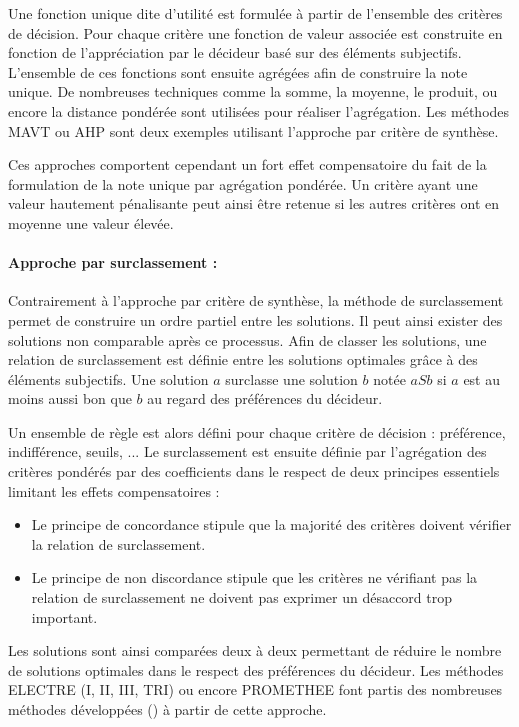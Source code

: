 Une fonction unique dite d’utilité est formulée à partir de l’ensemble des critères
de décision. Pour chaque critère une fonction de valeur associée est construite en
fonction de l’appréciation par le décideur basé sur des éléments subjectifs.
L’ensemble de ces fonctions sont ensuite agrégées afin de construire la note unique.
De nombreuses techniques comme la somme, la moyenne, le produit, ou encore la distance
pondérée sont utilisées pour réaliser l’agrégation.
Les méthodes MAVT ou AHP sont deux exemples utilisant l’approche par critère de
synthèse.

Ces approches comportent cependant un fort effet compensatoire du fait de la formulation
de la note unique par agrégation pondérée. Un critère ayant une valeur hautement
pénalisante peut ainsi être retenue si les autres critères ont en moyenne une valeur élevée.



\paragraph{Approche par surclassement :} %
\label{par:approche_par_surclassement}
Contrairement à l’approche par critère de synthèse, la méthode de surclassement
permet de construire un ordre partiel entre les solutions. Il peut ainsi exister
des solutions non comparable après ce processus.
Afin de classer les solutions, une relation de surclassement est définie entre les
solutions optimales grâce à des éléments subjectifs.
Une solution $a$ surclasse une solution $b$ notée $aSb$ si $a$ est au moins aussi bon que
$b$ au regard des préférences du décideur.

Un ensemble de règle est alors défini pour chaque critère de décision : préférence,
indifférence, seuils, ...
Le surclassement est ensuite définie par l’agrégation des critères pondérés par
des coefficients dans le respect de deux principes essentiels limitant les effets
compensatoires :
\begin{itemize}
  \item Le principe de concordance stipule que la majorité des critères doivent
        vérifier la relation de surclassement.
  \item Le principe de non discordance stipule que les critères ne vérifiant pas
        la relation de surclassement ne doivent pas exprimer un désaccord trop
        important.
\end{itemize}
Les solutions sont ainsi comparées deux à deux permettant de réduire le nombre de
solutions optimales dans le respect des préférences du décideur.
Les méthodes ELECTRE (I, II, III, TRI) ou encore PROMETHEE font partis des nombreuses
méthodes développées () à partir de cette approche.

